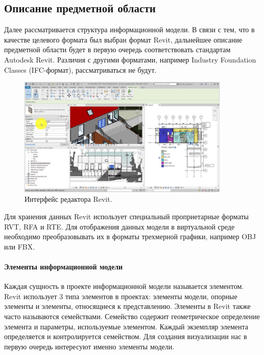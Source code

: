 ﻿\subsection{Описание предметной области}
\label{subsections:DomainModel}

Далее рассматривается структура информационной модели.
В связи с тем, что в качестве целевого формата был выбран  формат Revit,
дальнейшее описание предметной области будет в первую очередь
соответствовать стандартам Autodesk Revit.
Различия с другими форматами, например Industry Foundation Classes (IFC-формат),%
\cite{BuildingSmartIFC}
рассматриваться не будут.

\begin{figure}[ht]
    \centering
    \includegraphics[width=0.9\textwidth]{images/Revit-interface.jpg}
    \caption{Интерфейс редактора Revit.%
    \cite{DocRevit}}
    \label{figure:RevitInterface}
\end{figure}

Для хранения данных Revit использует специальный проприетарные форматы RVT, RFA и RTE.
Для отображения данных модели в виртуальной среде необходимо
преобразовывать их в форматы трехмерной графики, например OBJ или FBX.

\paragraph{Элементы информационной модели}

Каждая сущность в проекте информационной модели называется элементом.
Revit использует 3 типа элементов в проектах:
элементы модели, опорные элементы и элементы, относящиеся к представлению.
Элементы в Revit также часто называются семействами.
Семейство содержит геометрическое определение элемента и
параметры, используемые элементом.
Каждый экземпляр элемента определяется и контролируется семейством.%
\cite{DocRevit}
Для создания визуализации нас в первую очередь интересуют
именно элементы модели.

